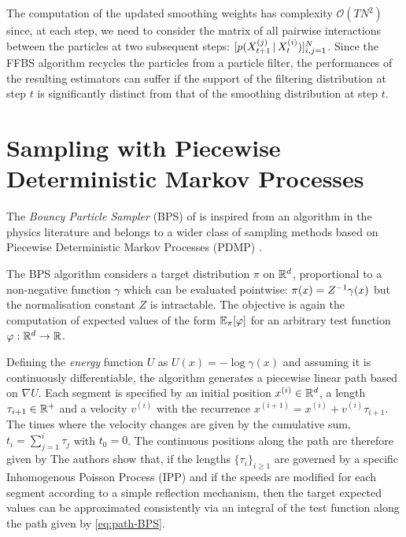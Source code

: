 The computation of the updated smoothing weights has complexity $\mathcal O(TN^{2})$ since, at each step, we need to consider the matrix of all pairwise interactions between the particles at two subsequent steps: $[p(X^{(j)}_{t+1}\,|\, X^{(i)}_{t})]_{i,j=1}^{N}$. Since the FFBS algorithm recycles the particles from a particle filter, the performances of the resulting estimators can suffer if the support of the filtering distribution at step $t$ is significantly distinct from that of the smoothing distribution at step $t$.




\section{\label{point:BPS}Sampling with Piecewise Deterministic Markov Processes}
The \emph{Bouncy Particle Sampler} (BPS) of \citet{bouchard15} is inspired from an algorithm in the physics literature \citep{peters12} and belongs to a wider class of sampling methods based on Piecewise Deterministic Markov Processes (PDMP) \citep{bierkens16, bierkens17, wu17}.

The BPS algorithm considers a target distribution $\pi$ on $\mathbb R^{d}$, proportional to a non-negative function $\gamma$ which can be evaluated pointwise: $\pi(x) = Z^{-1} \gamma(x)$
but the normalisation constant $Z$ is intractable. 
The objective is again the computation of expected values of the form $\mathbb E_\pi[\varphi]$ for an arbitrary test function $\varphi:\mathbb R^{d}\to \mathbb R$. 

Defining the \emph{energy} function $U$ as $U(x) = -\log \gamma(x)	$
 and assuming it is continuously differentiable, the algorithm generates a piecewise linear path based on $\nabla U$. 
 Each segment is specified by an initial position $x^{(i)}\in \mathbb R^{d}$, a length $\tau_{i+1}\in \mathbb R^{+}$ and a velocity $v^{(i)}$ with the recurrence $x^{(i+1)}=x^{(i)}+v^{(i)}\tau_{i+1}$. The times where the velocity changes are given by the cumulative sum, $t_i=\sum_{j=1}^{i}\tau_j$ with $t_0=0$. The continuous positions along the path are therefore given by
\eqa{	x(t) &=& x^{(i)} + v^{(i)}(t-t_i), \quad\text{for}\quad t\in[t_i,t_{i+1}).	\label{eq:path-BPS}}
The authors show that, if the lengths $\{\tau_{i}\}_{i\ge 1}$ are governed by a specific Inhomogenous Poisson Process (IPP) and if the speeds are modified for each segment according to a simple reflection mechanism, then the target expected values can be approximated consistently via an integral of the test function along the path given by \eqref{eq:path-BPS}.

